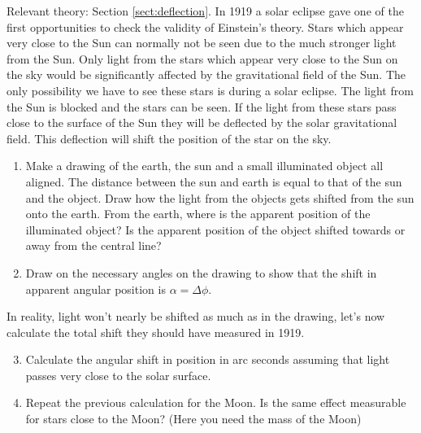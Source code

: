{\begin{multicols}{2}
\vspace{0.5cm}


Relevant theory: Section \ref{sect:deflection}.\newline
In 1919 a solar eclipse gave one of the first opportunities to check the validity of Einstein's theory. Stars which appear very close to the Sun can normally not be seen due to the much stronger light from the Sun. Only light from the stars which appear very close to the Sun on the sky would be significantly affected by the gravitational field of the Sun. The only possibility we have to see these stars is during a solar eclipse. The light from the Sun is blocked and the stars can be seen. If the light from these stars pass close to the surface of the Sun they will be deflected by the solar gravitational field. This deflection will shift the position of the star on the sky.
\begin{enumerate}
\item Make a drawing of the earth, the sun and a small illuminated object all aligned. The distance between the sun and earth is equal to that of the sun and the object. Draw how the light from the objects gets shifted from the sun onto the earth. From the earth, where is the apparent position of the illuminated object? Is the apparent position of the object shifted towards or away from the central line? 

\item Draw on the necessary angles on the drawing to show that the shift in apparent angular position is $\alpha=\Delta \phi$.
\end{enumerate}
In reality, light won't nearly be shifted as much as in the drawing, let's now calculate the total shift they should have measured in 1919.
\begin{enumerate}
\setcounter{enumi}{2}
\item Calculate the angular shift in position in arc seconds assuming that light passes very close to the solar surface.
\item Repeat the previous calculation for the Moon. Is the same effect measurable for stars close to the Moon? (Here you need the mass of the Moon)
\end{enumerate}

\vspace{1cm}



\end{multicols}}
